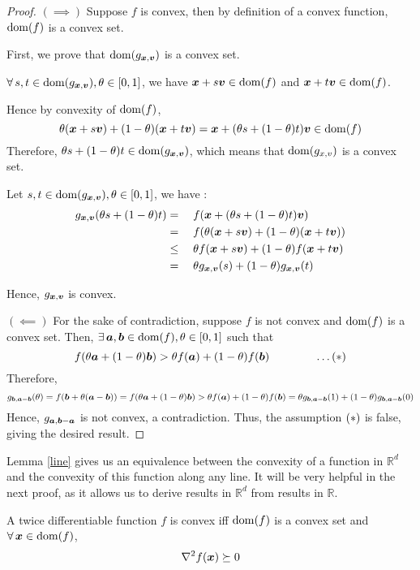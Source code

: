\documentclass{article}
\newcommand{\R}{\mathbb{R}}
\begin{document}
\begin{proof}
$(\implies)$ Suppose $f$ is convex, then by definition of a convex function, $\operatorname{dom}(f)$ is a convex set.

First, we prove that $\operatorname{dom}(g_{{\bm{x}},{\bm{v}}})$ is a convex set.

$\forall s,t \in \dom(g_{\vx,\vv}), \theta\in[0,1]$, we have ${\bm{x}} + s{\bm{v}} \in \operatorname{dom}(f)$ and ${\bm{x}} + t{\bm{v}}\in\operatorname{dom}(f)$.

Hence by convexity of $\operatorname{dom}(f)$,
\[
\theta ({\bm{x}} + s{\bm{v}}) + (1-\theta)({\bm{x}} + t{\bm{v}}) = {\bm{x}} + (\theta s + (1-\theta)t){\bm{v}} \in\operatorname{dom}(f)
\]
Therefore, $\theta s + (1-\theta)t \in \operatorname{dom}(g_{{\bm{x}},{\bm{v}}})$, which means that $\operatorname{dom}(g_{x,v})$ is a convex set.

Let $s,t\in\operatorname{dom}(g_{{\bm{x}},{\bm{v}}}),\theta\in[0,1]$, we have :
\begin{align*}
    g_{{\bm{x}},{\bm{v}}}(\theta s+(1-\theta) t) &= \quad f({\bm{x}} + (\theta s+(1-\theta) t){\bm{v}})\\
    &= \quad f(\theta({\bm{x}}+s{\bm{v}})+(1-\theta)({\bm{x}}+t{\bm{v}}))\\
    &\leq \quad \theta f({\bm{x}}+s{\bm{v}}) + (1-\theta)f({\bm{x}}+t{\bm{v}})\\
    &= \quad\theta g_{{\bm{x}},{\bm{v}}}(s) + (1-\theta)g_{{\bm{x}},{\bm{v}}}(t) 
\end{align*}

Hence, $g_{{\bm{x}},{\bm{v}}}$ is convex.

$(\impliedby)$ For the sake of contradiction, suppose $f$ is not convex and $\operatorname{dom}(f)$ is a convex set. 
Then, $\exists \va,\vb \in \dom(f), \theta \in [0,1]$ such that \[
    f(\theta {\bm{a}} + (1-\theta){\bm{b}})>\theta f({\bm{a}}) + (1-\theta)f({\bm{b}})
    \qquad\qquad \ldots\left(\ast\right)
\]
Therefore,
\[
 g_{{\bm{b}},{\bm{a}}-{\bm{b}}}(\theta) = f({\bm{b}} + \theta({\bm{a}}-{\bm{b}})) = f(\theta{\bm{a}} + (1-\theta){\bm{b}}) > \theta f({\bm{a}}) + (1-\theta)f({\bm{b}}) = \theta g_{{\bm{b}},{\bm{a}}-{\bm{b}}}(1) + (1-\theta) g_{{\bm{b}},{\bm{a}}-{\bm{b}}}(0)
\]
Hence, $g_{{\bm{a}},{\bm{b}}-{\bm{a}}}$ is not convex, a contradiction.
Thus, the assumption $\left(\ast\right)$ is false, giving the desired result.
\end{proof}{}

Lemma \ref{line} gives us an equivalence between the convexity of a function in $\R^d$ and the convexity of this function along any line. It will be very helpful in the next proof, as it allows us to derive results in $\R^d$ from results in $\R$.

\begin{lemma}\label{second}
A twice differentiable function $f$ is convex iff $\operatorname{dom}(f)$ is a convex set and $\forall \vx \in \dom(f)$,
\[
\nabla^{2}f({\bm{x}})\succeq 0
\]
\end{lemma}
\end{document}
